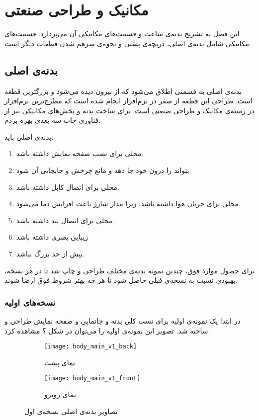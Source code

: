 \chapter{مکانیک و طراحی صنعتی} \label{chap:mechanical}

این فصل به تشریح بدنه‌ی ساعت و قسمت‌های مکانیکی آن می‌پردازد. قسمت‌های مکانیکی شامل بدنه‌ی اصلی، دریچه‌ی پشتی و نحوه‌ی سرهم شدن قطعات دیگر است.
\section{بدنه‌ی اصلی}
بدنه‌ی اصلی به قسمتی اطلاق می‌شود که از بیرون دیده می‌شود و بزرگترین قطعه است. طراحی این قطعه از صفر در نرم‌افزار  انجام شده است که مطرح‌ترین نرم‌افزار در زمینه‌ی مکانیک و طراحی صنعتی است. برای ساخت بدنه و بخش‌های مکانیکی نیز از فناوری چاپ سه بعدی بهره بردم.

بدنه‌ی اصلی باید:
\begin{multicols}{2}
\begin{enumerate}
	\item محلی برای نصب صفحه نمایش داشته باشد.
	\item  بتواند \pcbf را درون خود جا دهد و مانع چرخش و جابجایی آن شود.
	\item محلی برای اتصال کابل  داشته باشد.
	\item محلی برای جریان هوا داشته باشد. زیرا مدار شارژ باعث افزایش دما می‌شود.
	\item محلی برای اتصال بند داشته باشد.
	\item زیبایی بصری داشته باشد
	\item بیش از حد بزرگ نباشد.
\end{enumerate}
\end{multicols}

برای حصول موارد فوق، چندین نمونه بدنه‌ی مختلف طراحی و چاپ شد تا در هر نسخه، بهبودی نسبت به نسخه‌ی قبلی حاصل شود تا هر چه بهتر شروط فوق ارضا شوند.

\subsection{نسخه‌های اولیه}

در ابتدا یک نمونه‌ی اولیه برای تست کلی بدنه و جانمایی \pcbf و صفحه نمایش طراحی و ساخته شد. تصویر این نمونه‌ی اولیه را می‌توان در شکل ؟ مشاهده کرد.

\begin{figure}[h]
	\centering
	\begin{subfigure}{0.44\textwidth}
		\centering
		\texttt{[image: body\_main\_v1\_back]}
		\caption{نمای پشت}
	\end{subfigure}
	\begin{subfigure}{0.44\textwidth}
		\centering
		\texttt{[image: body\_main\_v1\_front]}
		\caption{نمای روبرو}
	\end{subfigure}
	\caption{تصاویر بدنه‌ی اصلی نسخه‌ی اول}
	\label{fig:body-v1}
\end{figure}

